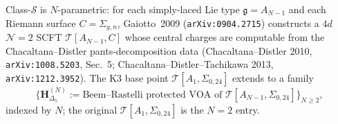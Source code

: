 \begin{remark}
\label{rem:thqg-occ-N-parametric}
Class-$\mathcal S$ is $N$-parametric: for each simply-laced Lie type
$\mathfrak g = A_{N-1}$ and each Riemann surface $C = \Sigma_{g,n}$,
Gaiotto~2009 (\texttt{arXiv:0904.2715}) constructs a $4d$
$\mathcal N = 2$ SCFT $\mathcal T[A_{N-1}, C]$ whose central charges
are computable from the Chacaltana--Distler pants-decomposition data
(Chacaltana--Distler 2010, \texttt{arXiv:1008.5203}, Sec.~5;
Chacaltana--Distler--Tachikawa 2013, \texttt{arXiv:1212.3952}). The
K3 base point $\mathcal T[A_1, \Sigma_{0,24}]$ extends to a
family
\[
 \bigl\{\mathbf H^{(N)}_{\Delta_5}
 := \text{Beem--Rastelli protected VOA of }
 \mathcal T[A_{N-1}, \Sigma_{0,24}]\bigr\}_{N \ge 2},
\]
indexed by $N$; the original $\mathcal T[A_1,\Sigma_{0,24}]$ is the $N = 2$ entry.
\end{remark}

